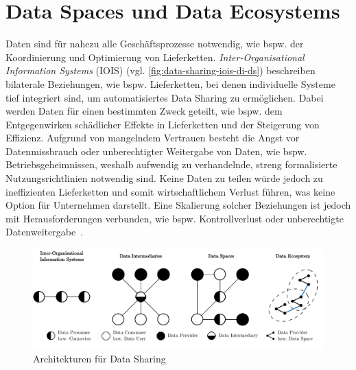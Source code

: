 
\section{Data Spaces und Data Ecosystems}

Daten sind für nahezu alle Geschäftsprozesse notwendig, wie bspw. der Koordinierung und Optimierung von Lieferketten.
\emph{Inter-Organisational Information Systems} (IOIS) (vgl. \autoref{fig:data-sharing-iois-di-ds}) beschreiben bilaterale Beziehungen, wie bspw. Lieferketten, bei denen individuelle Systeme tief integriert sind, um automatisiertes Data Sharing zu ermöglichen.
Dabei werden Daten für einen bestimmten Zweck geteilt, wie bspw. dem Entgegenwirken schädlicher Effekte in Lieferketten und der Steigerung von Effizienz.
Aufgrund von mangelndem Vertrauen besteht die Angst vor Datenmissbrauch oder unberechtigter Weitergabe von Daten, wie bspw. Betriebsgeheimnissen, weshalb aufwendig zu verhandelnde, streng formalisierte Nutzungsrichtlinien notwendig sind.
Keine Daten zu teilen würde jedoch zu ineffizienten Lieferketten und somit wirtschaftlichem Verlust führen, was keine Option für Unternehmen darstellt.
Eine Skalierung solcher Beziehungen ist jedoch mit Herausforderungen verbunden, wie bspw. Kontrollverlust oder unberechtigte Datenweitergabe~\cite{mollerIndustrialDataEcosystems2024}.

\begin{figure}
    \includegraphics[width=\textwidth]{./assets/data_sharing_architectures.drawio.pdf}
    \caption{Architekturen für Data Sharing~\cite[vgl.][]{mollerIndustrialDataEcosystems2024}}
    \label{fig:data-sharing-iois-di-ds}
\end{figure}

